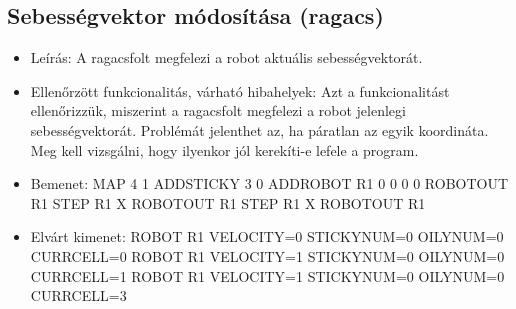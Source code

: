\subsection{Sebességvektor módosítása (ragacs)}
\begin{itemize}
	\item Leírás: \newline
	A ragacsfolt megfelezi a robot aktuális sebességvektorát.
	\item Ellenőrzött funkcionalitás, várható hibahelyek: \newline 
	Azt a funkcionalitást ellenőrizzük, miszerint a ragacsfolt megfelezi a robot jelenlegi sebességvektorát. Problémát jelenthet az, ha páratlan az egyik koordináta. Meg kell vizsgálni, hogy ilyenkor jól kerekíti-e lefele a program.
	
	\item Bemenet: \newline
		MAP 4 1 \newline
		ADDSTICKY 3 0 \newline
		ADDROBOT R1 0 0 0 0 \newline
		ROBOTOUT R1  \newline
		STEP R1 X \newline
		ROBOTOUT R1 \newline
		STEP R1 X \newline
		ROBOTOUT R1 \newline
		
	\item Elvárt kimenet: \newline
	ROBOT R1 VELOCITY=0 STICKYNUM=0 OILYNUM=0 CURRCELL=0 \newline
	ROBOT R1 VELOCITY=1 STICKYNUM=0 OILYNUM=0 CURRCELL=1 \newline
	ROBOT R1 VELOCITY=1 STICKYNUM=0 OILYNUM=0 CURRCELL=3 \newline
	
\end{itemize}

